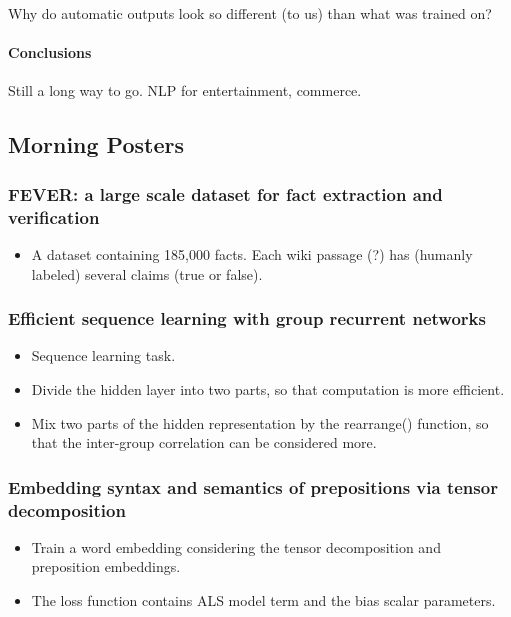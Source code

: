 Why do automatic outputs look so different (to us) than what was trained on?

\paragraph{Conclusions}
Still a long way to go. NLP for entertainment, commerce.


\subsection{Morning Posters}

\subsubsection{FEVER: a large scale dataset for fact extraction and verification \cite{Thorne2018FEVER:}}
\begin{itemize}
	\item A dataset containing 185,000 facts. Each wiki passage (?) has (humanly labeled) several claims (true or false).
\end{itemize}

\subsubsection{Efficient sequence learning with group recurrent networks \cite{Gao2018Efficient}}
\begin{itemize}
	\item Sequence learning task.
	\item Divide the hidden layer into two parts, so that computation is more efficient.
	\item Mix two parts of the hidden representation by the rearrange() function, so that the inter-group correlation can be considered more.
\end{itemize}

\subsubsection{Embedding syntax and semantics of prepositions via tensor decomposition \cite{Gong2018Embedding}}
\begin{itemize}
	\item Train a word embedding considering the tensor decomposition and preposition embeddings.
	\item The loss function contains ALS model term and the bias scalar parameters.
\end{itemize}

